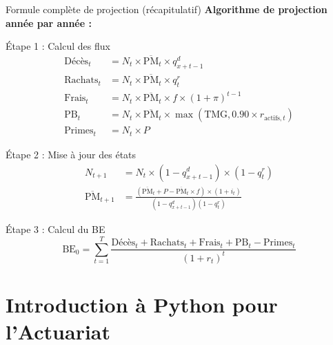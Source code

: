 \documentclass[10pt,aspectratio=169]{beamer}
\newcommand{\BE}{\text{BE}}
\newcommand{\PM}{\text{PM}}
\newcommand{\TMG}{\text{TMG}}
\newcommand{\PB}{\text{PB}}
\begin{document}
\begin{frame}{Formule complète de projection (récapitulatif)}
\textbf{Algorithme de projection année par année :}

\begin{block}{Étape 1 : Calcul des flux}
\begin{align}
\text{Décès}_t &= N_t \times \overline{\PM}_t \times q_{x+t-1}^d \\
\text{Rachats}_t &= N_t \times \overline{\PM}_t \times q_t^r \\
\text{Frais}_t &= N_t \times \overline{\PM}_t \times f \times (1+\pi)^{t-1} \\
\PB_t &= N_t \times \overline{\PM}_t \times \max(\TMG, 0.90 \times r_{\text{actifs},t}) \\
\text{Primes}_t &= N_t \times P
\end{align}
\end{block}

\begin{block}{Étape 2 : Mise à jour des états}
\begin{align}
N_{t+1} &= N_t \times (1 - q_{x+t-1}^d) \times (1 - q_t^r) \\
\overline{\PM}_{t+1} &= \frac{(\overline{\PM}_t + P - \overline{\PM}_t \times f) \times (1 + i_t)}{(1 - q_{x+t-1}^d)(1 - q_t^r)}
\end{align}
\end{block}

\begin{block}{Étape 3 : Calcul du BE}
\[
\boxed{\BE_0 = \sum_{t=1}^{T} \frac{\text{Décès}_t + \text{Rachats}_t + \text{Frais}_t + \PB_t - \text{Primes}_t}{(1+r_t)^t}}
\]
\end{block}
\end{frame}

\section{Introduction à Python pour l'Actuariat}
\end{document}
